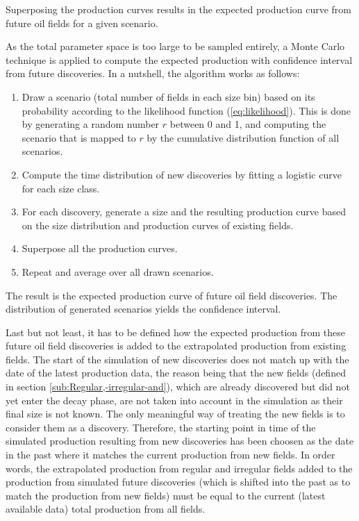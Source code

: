 \documentclass[review]{elsarticle}
\begin{document}
Superposing the production curves results in the expected production
curve from future oil fields for a given scenario.

As the total parameter space is too large to be sampled entirely,
a Monte Carlo technique is applied to compute the expected production
with confidence interval from future discoveries. In a nutshell, the
algorithm works as follows:
\begin{enumerate}
\item Draw a scenario (total number of fields in each size bin) based on its probability according to the likelihood function (\ref{eq:likelihood}). This is done by generating a random number $r$ between 0 and 1, and computing the scenario that is mapped to $r$ by the cumulative distribution function of all scenarios.
\item Compute the time distribution of new discoveries by fitting a logistic
curve for each size class.
\item For each discovery, generate a size and the resulting production curve
based on the size distribution and production curves of existing fields.
\item Superpose all the production curves.
\item Repeat and average over all drawn scenarios.
\end{enumerate}
The result is the expected production curve of future oil field discoveries.
The distribution of generated scenarios yields the confidence interval.

Last but not least, it has to be defined how the expected production from these future oil field discoveries is added to the extrapolated production from existing fields. The start of the simulation of new discoveries does not match up with the date of the latest production data, the reason being that the new fields (defined in section \ref{sub:Regular,-irregular-and}), which are already discovered but did not yet enter the decay phase, are not taken into account in the simulation as their final size is not known. The only meaningful way of treating the new fields is to consider them as a discovery. Therefore, the starting point in time of the simulated production resulting from new discoveries has been choosen as the date in the past where it matches the current production from
new fields. In order words, the extrapolated production from regular and irregular fields added to the production from simulated future discoveries (which is shifted into the past as to match the production from new fields) must be equal to the current (latest available data) total production from all fields.
\end{document}
